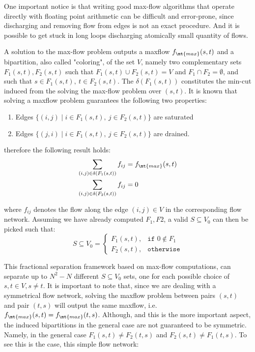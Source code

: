 One important notice is that writing good max-flow algorithms that operate directly with floating point arithmetic can be difficult and error-prone, since discharging and removing flow from edges is not an exact procedure.
And it is possible to get stuck in long loops discharging atomically small quantity of flows.


A solution to the max-flow problem outputs a maxflow $f_{\mt{max}}(s, t)$ and a bipartition, also called "coloring", of the set $V$, namely two complementary sets $F_1(s, t), F_2(s, t)$ such that $F_1(s, t) \cup F_2(s, t) = V$ and $F_1 \cap F_2 = \emptyset$, and such that $s \in F_1(s, t),\ t \in F_2(s, t)$.
The $\delta(F_1(s, t))$ constitutes the min-cut induced from the solving the max-flow problem over $(s, t)$.
It is known that solving a maxflow problem guarantees the following two properties:

\begin{enumerate}
	\item Edges $\{ (i, j) \mid i \in F_1(s, t),\ j \in F_2(s, t) \}$ are saturated
	\item Edges $\{ (j, i) \mid i \in F_1(s, t),\ j \in F_2(s, t) \}$ are drained.
\end{enumerate}

therefore the following result holds:
\begin{align}
	\sum_{(i, j) \in \delta(F_1(s, t))} f_{ij} & = f_{\mt{max}}(s, t) \\
	\sum_{(i, j) \in \delta(F_2(s, t))} f_{ij} & = 0
\end{align}

where $f_{ij}$ denotes the flow along the edge $(i, j) \in V$ in the corresponding flow network.
Assuming we have already computed $F_1, F2$, a valid $S \subseteq V_0$ can then be picked such that:
\begin{equation}
	S \subseteq V_0 =
	\begin{cases}
		F_1(s, t), & \texttt{if } 0 \notin F_1 \\
		F_2(s, t), & \texttt{otherwise}
	\end{cases}
\end{equation}

This fractional separation framework based on max-flow computations, can separate up to $N^2 - N$ different $S \subseteq V_0$ sets, one for each possible choice of $s, t \in V, s \ne t$.
It is important to note that, since we are dealing with a symmetrical flow network, solving the maxflow problem between pairs $(s, t)$ and pair $(t, s)$ will output the same maxflow, i.e. $f_{\mt{max}}(s, t) = f_{\mt{max}}(t, s)$.
Although, and this is the more important aspect, the induced bipartitions in the general case are not guaranteed to be symmetric.
Namely, in the general case $F_1(s, t) \ne F_2(t, s)$ and $F_2(s, t) \ne F_1(t, s)$.
To see this is the case, this simple flow network:

